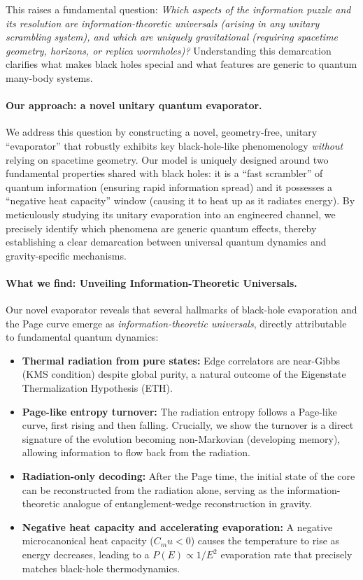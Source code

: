 \documentclass[aps,prx,onecolumn,showpacs,superscriptaddress,longbibliography,nofootinbib]{revtex4-2}
\def\mu{mu}%
\begin{document}
This raises a fundamental question: \emph{Which aspects of the information puzzle and its resolution are information-theoretic universals (arising in any unitary scrambling system), and which are uniquely gravitational (requiring spacetime geometry, horizons, or replica wormholes)?} Understanding this demarcation clarifies what makes black holes special and what features are generic to quantum many-body systems.

\paragraph*{Our approach: a novel unitary quantum evaporator.}
We address this question by constructing a novel, geometry-free, unitary ``evaporator'' that robustly exhibits key black-hole-like phenomenology \emph{without} relying on spacetime geometry. Our model is uniquely designed around two fundamental properties shared with black holes: it is a ``fast scrambler'' of quantum information (ensuring rapid information spread) and it possesses a ``negative heat capacity'' window (causing it to heat up as it radiates energy). By meticulously studying its unitary evaporation into an engineered channel, we precisely identify which phenomena are generic quantum effects, thereby establishing a clear demarcation between universal quantum dynamics and gravity-specific mechanisms.

\paragraph*{What we find: Unveiling Information-Theoretic Universals.}
Our novel evaporator reveals that several hallmarks of black-hole evaporation and the Page curve emerge as \emph{information-theoretic universals}, directly attributable to fundamental quantum dynamics:
\begin{itemize}[leftmargin=*]
\item \textbf{Thermal radiation from pure states:} Edge correlators are near-Gibbs (KMS condition) despite global purity, a natural outcome of the Eigenstate Thermalization Hypothesis (ETH).
\item \textbf{Page-like entropy turnover:} The radiation entropy follows a Page-like curve, first rising and then falling. Crucially, we show the turnover is a direct signature of the evolution becoming non-Markovian (developing memory), allowing information to flow back from the radiation.
\item \textbf{Radiation-only decoding:} After the Page time, the initial state of the core can be reconstructed from the radiation alone, serving as the information-theoretic analogue of entanglement-wedge reconstruction in gravity.
\item \textbf{Negative heat capacity and accelerating evaporation:} A negative microcanonical heat capacity ($C_\mu<0$) causes the temperature to rise as energy decreases, leading to a $P(E) \propto 1/E^2$ evaporation rate that precisely matches black-hole thermodynamics.
\end{itemize}
\end{document}
